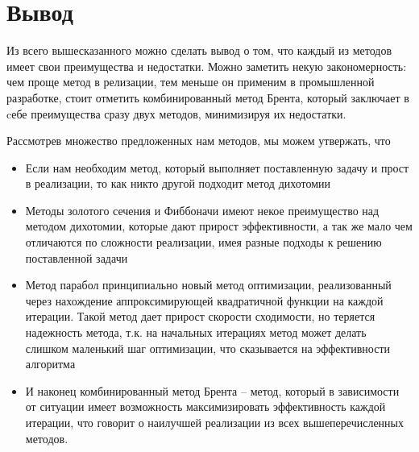 \documentclass[a4paper, 14pt]{article}
\begin{document}
  
  \section*{Вывод}
  Из всего вышесказанного можно сделать вывод о том, что каждый из методов имеет свои преимущества и недостатки. Можно заметить некую закономерность: чем проще метод в релизации, тем меньше он применим в промышленной разработке, стоит отметить комбинированный метод Брента, который заключает в cебе преимущества сразу двух методов, минимизируя их недостатки. 
  
  Рассмотрев множество предложенных нам методов, мы можем утвержать, что 
  \begin{itemize}
		\item Если нам необходим метод, который выполняет поставленную задачу и прост в реализации, то как никто другой подходит метод дихотомии
		\item Методы золотого сечения и Фиббоначи имеют некое преимущество над методом дихотомии, которые дают прирост эффективности, а так же мало чем отличаются по сложности реализации, имея разные подходы к решению поставленной задачи
		\item Метод парабол принципиально новый метод оптимизации, реализованный через нахождение аппроксимирующей квадратичной функции на каждой итерации. Такой метод дает прирост скорости сходимости, но теряется надежность метода, т.к. на начальных итерациях метод может делать слишком маленький шаг оптимизации, что сказывается на эффективности алгоритма
		\item И наконец комбинированный метод Брента -- метод, который в зависимости от ситуации имеет возможность максимизировать эффективность каждой итерации, что говорит о наилучшей реализации из всех вышеперечисленных методов. 
	\end{itemize}
  
\end{document}

